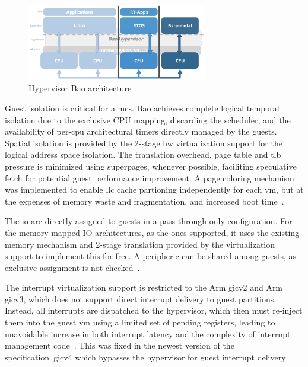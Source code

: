 \begin{figure}[!hbt]
  \centering
  \includegraphics[width=0.7\textwidth]{./img/png/bao-arch} 
%   
  \caption[Hypervisor Bao architecture]{Hypervisor Bao architecture~\cite{martins_et_al:OASIcs:2020:11779}\footnotemark}%
  \label{fig:bao-arch}
\end{figure}
%
%

Guest isolation is critical for a \gls{mcs}. Bao achieves complete logical
temporal isolation due to the exclusive CPU mapping, discarding the scheduler,
and the availability of per-\gls{cpu} architectural timers directly managed by
the guests. Spatial isolation is provided by the 2-stage \gls{hw} virtualization
support for the logical address space isolation. The translation overhead, page
table and \gls{tlb} pressure is minimized using superpages, whenever
possible, faciliting speculative fetch for potential guest performance
improvement. A page coloring mechanism was implemented to enable \gls{llc}
cache partioning independently for each \gls{vm}, but at the expenses of memory
waste and fragmentation, and increased boot time~\cite{martins_et_al:OASIcs:2020:11779}.

The \gls{io} are directly assigned to guests in a pass-through only
configuration. For the memory-mapped IO architectures, as the ones supported, it
uses the existing memory mechanism and 2-stage translation provided by the
virtualization support to implement this for free. A peripheric can be shared
among guests, as exclusive assignment is not checked~\cite{martins_et_al:OASIcs:2020:11779}.

The interrupt virtualization support is restricted to the Arm \gls{gic}v2 and
Arm \gls{gic}v3, which does not support direct interrupt delivery to guest
partitions. Instead, all interrupts
are dispatched to the hypervisor, which then must re-inject them into the guest \gls{vm} using
a limited set of pending registers, leading to unavoidable increase in both
interrupt latency and the complexity of interrupt management code~\cite{martins_et_al:OASIcs:2020:11779}. This was
fixed in the newest version of the specification~\gls{gic}v4 which bypasses the hypervisor for guest interrupt delivery~\cite{dall2018design}.

